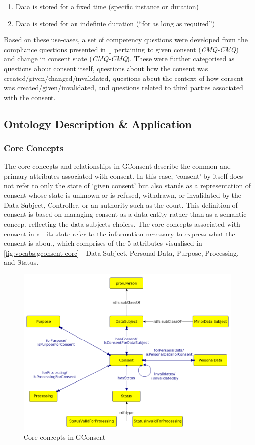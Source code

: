 \begin{enumerate}
  \begin{enumerate}
  \item
    Data is stored for a fixed time (specific instance or duration)
  \item
    Data is stored for an indefinte duration (``for as long as
    required'')
  \end{enumerate}
\end{enumerate}
Based on these use-cases, a set of competency questions were developed from the compliance questions presented in \autoref{} pertaining to given consent (\textit{CMQ-CMQ}) and change in consent state (\textit{CMQ-CMQ}).
These were further categorised as questions about consent itself, questions about how the consent was created/given/changed/invalidated, questions about the context of how consent was created/given/invalidated, and questions related to third parties associated with the consent.

\subsection{Ontology Description \& Application}
\subsubsection{Core Concepts}
The core concepts and relationships in GConsent describe the common and primary attributes associated with consent.
In this case, `consent' by itself does not refer to only the state of `given consent' but also stands as a representation of consent whose state is unknown or is refused, withdrawn, or invalidated by the Data Subject, Controller, or an authority such as the court. This definition of consent is based on managing consent as a data entity rather than as a semantic concept reflecting the data subjects choices. 
The core concepts associated with consent in all its state refer to the information necessary to express what the consent is about, which comprises of the 5 attributes visualised in \autoref{fig:vocabs:gconsent-core} - Data Subject, Personal Data, Purpose, Processing, and Status.
\begin{figure}[htbp]
    \centering
    \includegraphics[width=0.8\linewidth]{img/gconsent_core.png}
    \caption{Core concepts in GConsent \cite{}}
    \label{fig:vocabs:gconsent-core}
\end{figure}


